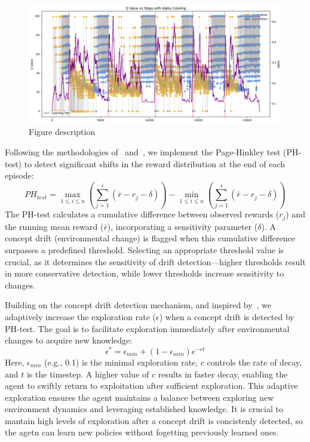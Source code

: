 \begin{figure}
    \centering
    \includegraphics[width=0.75\columnwidth]{figures/alpha.png}
    \caption{Figure description}
    \label{fig:alpha}
  \end{figure}

Following the methodologies of~\citet{mignon2017adaptive} and~\citet{networkdynamicrl}, we implement the Page-Hinkley test (PH-test) to detect significant shifts in the reward distribution at the end of each episode:
\begin{equation}
    \label{eq:ph_test}
    PH_{test} = \max_{1 \leq i \leq n} \left(\sum_{j=1}^{i}(\bar{r}-r_j-\delta)\right) - \min_{1 \leq i \leq n}\left(\sum_{j=1}^{i}(\bar{r}-r_j-\delta)\right)
\end{equation}
The PH-test calculates a cumulative difference between observed rewards ($r_j$) and the running mean reward ($\bar{r}$), incorporating a sensitivity parameter ($\delta$). A concept drift (environmental change) is flagged when this cumulative difference surpasses a predefined threshold. Selecting an appropriate threshold value is crucial, as it determines the sensitivity of drift detection—higher thresholds result in more conservative detection, while lower thresholds increase sensitivity to changes.

Building on the concept drift detection mechanism, and inspired by~\citet{mignon2017adaptive}, we adaptively increase the exploration rate ($\epsilon$) when a concept drift is detected by PH-test. The goal is to facilitate exploration immediately after environmental changes to acquire new knowledge:
\begin{equation}
    \label{eq:epsilon_greedy}
    \epsilon^* = \epsilon_{min} + (1-\epsilon_{min}) e^{-ct}
\end{equation}
Here, $\epsilon_{min}$ (e.g., 0.1) is the minimal exploration rate, $c$ controls the rate of decay, and $t$ is the timestep. A higher value of $c$ results in faster decay, enabling the agent to swiftly return to exploitation after sufficient exploration. This adaptive exploration ensures the agent maintains a balance between exploring new environment dynamics and leveraging established knowledge. It is crucial to mantain high levels of exploration after a concept drift is concistenly detected, so the agetn can learn new policies  without fogetting previously learned ones.

